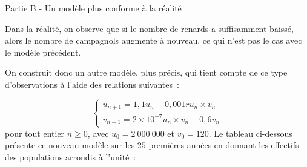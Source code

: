\bigskip
\begin{center}\begin{h3}Partie B - Un modèle plus conforme à la réalité \end{h3}\end{center}
\medskip
Dans la réalité, on observe que si le nombre de renards a suffisamment baissé, alors le nombre de
campagnols augmente à nouveau, ce qui n'est pas le cas avec le modèle précédent.
\par
On construit donc un autre modèle, plus précis, qui tient compte de ce type d'observations à l'aide des relations suivantes~:
\par
\[\left\{\begin{array}{l}
          u_{n+1} = 1,1u_n - 0,001ru_n \times v_n\\
          v_{n+1} = 2 \times 10^{-7} u_n \times v_n + 0,6v_n
\end{array}\right.\]
pour tout entier $n \geqslant 0$, avec $u_0 = 2~000~000$ et $v_0 = 120$.
\medskip
Le tableau ci-dessous présente ce nouveau modèle sur les $25$ premières années en donnant les
effectifs des populations arrondis à l'unité~:
